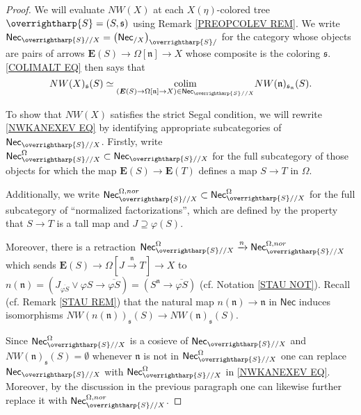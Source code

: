\documentclass[a4paper,10pt]{article}%
\numberwithin{equation}{section}
\numberwithin{figure}{section}
\theoremstyle{definition} %
\newcommand{\vect}[1]{\text{\overrightharp{\ensuremath{#1}}}}
\DeclareMathOperator{\colim}{colim}%
\newcommand{\1}{\ensuremath{\mathbbm 1}}%
\begin{document}
\begin{proof}
	We will evaluate 
	$NW(X)$ at each $X(\eta)$-colored tree
	$\vect{S}=(S,\mathfrak{s})$
	using Remark \ref{PREOPCOLEV REM}.
%	
	We write
	$\mathsf{Nec}_{\vect{S}//X}
	=
	\left(\mathsf{Nec}_{/X}\right)_{\vect{S}/}$
	for the category
	whose objects are pairs of arrows
	$\boldsymbol{E}(S) \to \Omega[\mathfrak{n}] \to X$
	whose composite is the coloring $\mathfrak{s}$.
	\eqref{COLIMALT EQ}
	then says that
\begin{equation}\label{NWKANEXEV EQ}
	NW(X)_{\mathfrak{s}}(S) 
	\simeq
	\underset{(\boldsymbol{E}(S) \to \Omega[\mathfrak{n}] \to X)
		\in \mathsf{Nec}_{\vect{S}//X}}{\colim}
	NW(\mathfrak{n})_{\mathfrak{s}_{\mathfrak{n}}}(S).
\end{equation}

	To show that $NW(X)$ satisfies the strict Segal condition, 
	we will rewrite \eqref{NWKANEXEV EQ} 
	by identifying appropriate subcategories of
	$\mathsf{Nec}_{\vect{S}//X}$.
	Firstly, write
	$\mathsf{Nec}_{\vect{S}//X}^{\Omega}
	\subset
	\mathsf{Nec}_{\vect{S}//X}$
	for the full subcategory of those objects for which the map
	$\boldsymbol{E}(S) \to \boldsymbol{E}(T)$
	defines a map $S \to T$ in $\Omega$.
		
	Additionally, we write 
	$
	\mathsf{Nec}_{\vect{S}//X}^{\Omega,nor}
	\subset
	\mathsf{Nec}_{\vect{S}//X}^{\Omega}
	$
	for the full subcategory of ``normalized factorizations'',
	which are defined by the property that
	$S \to T$ is a tall map and
	$J \supseteq \varphi(S)$.
	
	Moreover, there is a retraction
	$
	\mathsf{Nec}_{\vect{S}//X}^{\Omega}
	\xrightarrow{n}
	\mathsf{Nec}_{\vect{S}//X}^{\Omega,nor}
	$
	which sends
	$\boldsymbol{E}(S) \to \Omega[J \xrightarrow{\mathfrak{n}} T] \to X$
	to
	$n (\mathfrak{n}) = 
	(J_{\overline{\varphi S}} \vee \varphi S \to
	\overline{\varphi S})
	=
	(S^{\mathfrak{n}} \to \overline{\varphi S})
	$
	(cf. Notation \ref{STAU NOT}).
	Recall (cf. Remark \ref{STAU REM}) 
	that the natural map
	$n( \mathfrak{n}) \to \mathfrak{n}$ in $\mathsf{Nec}$
	induces isomorphisms
	$NW(n(\mathfrak{n}))_{\mathfrak{s}}(S) 
	\to
	NW(\mathfrak{n})_{\mathfrak{s}}(S)$.

	
	Since 
	$\mathsf{Nec}_{\vect{S}//X}^{\Omega}$
	is a cosieve of 
	$\mathsf{Nec}_{\vect{S}//X}$
	and 
	$NW(\mathfrak{n})_{\mathfrak{s}}(S) = \emptyset$
	whenever $\mathfrak{n}$ is not in 
	$\mathsf{Nec}_{\vect{S}//X}^{\Omega}$
	one can replace 
	$\mathsf{Nec}_{\vect{S}//X}$
	with 
	$\mathsf{Nec}_{\vect{S}//X}^{\Omega}$
	in
	\eqref{NWKANEXEV EQ}.
	Moreover, by the discussion in the previous paragraph one can
	likewise further replace it with
	$\mathsf{Nec}_{\vect{S}//X}^{\Omega,nor}$.
	

\end{proof}
\end{document}
